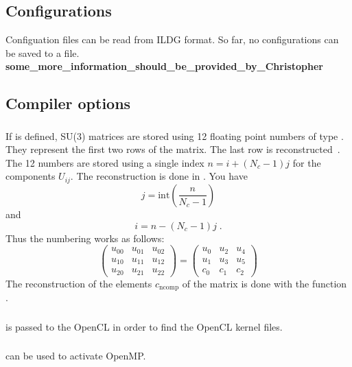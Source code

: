 \subsection{Configurations}
Configuation files can be read from ILDG format. So far, no configurations can be saved to a file. {\bf some\_more\_information\_should\_be\_provided\_by\_Christopher}

\subsection{Compiler options}
\subsubsection{}
If  is defined, SU(3) matrices are stored using 12 floating point numbers of type . They represent the first two rows of the matrix. The last row is reconstructed~\cite{Clark:2009wm}. The 12 numbers are stored using a single index $n=i+(N_c-1)j$ for the components $U_{ij}$. The reconstruction is done in . You have 
\[ j = \text{int} \left(\frac{n}{N_c-1}\right) \]
and
\[ i = n - (N_c-1)j\;. \]
Thus the numbering works as follows:
\[ \left(\begin{array}{rrr} u_{00} & u_{01} & u_{02} \\ u_{10} & u_{11} & u_{12} \\ u_{20} & u_{21} & u_{22}\end{array}\right)
=
\left(\begin{array}{rrr} u_{0} & u_{2} & u_{4} \\ u_{1} & u_{3} & u_{5} \\ c_0 & c_1 & c_2 \end{array}\right)
\]
The reconstruction of the elements $c_\text{ncomp}$ of the matrix  is done with the function .

\subsubsection{}
 is passed to the OpenCL  in order to find the OpenCL kernel files.
\subsubsection{}
 can be used to activate OpenMP.
